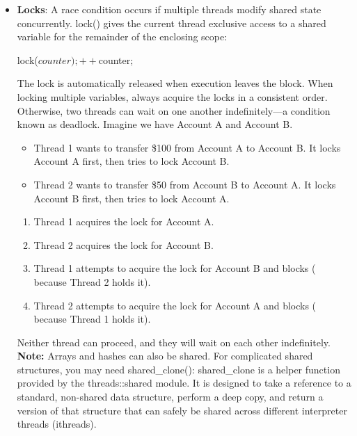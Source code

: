 \documentclass{report}
\begin{document}
\begin{itemize}
        \item \textbf{Locks}: A race condition occurs if multiple threads modify shared state concurrently. lock() gives the current thread exclusive access to a shared variable for the remainder of the enclosing scope:
            \bigbreak \noindent 
            \begin{perlcode}
                {
                    lock($counter);
                    ++$counter;
                }
            \end{perlcode}
            \bigbreak \noindent 
            The lock is automatically released when execution leaves the block. When locking multiple variables, always acquire the locks in a consistent order. Otherwise, two threads can wait on one another indefinitely—a condition known as deadlock.
            \bigbreak \noindent 
            Imagine we have Account A and Account B.
            \begin{itemize}
                \item Thread 1 wants to transfer \$100 from Account A to Account B. It locks Account A first, then tries to lock Account B.
                \item Thread 2 wants to transfer \$50 from Account B to Account A. It locks Account B first, then tries to lock Account A.
            \end{itemize}
            \begin{enumerate}
                \item Thread 1 acquires the lock for Account A.
                \item Thread 2 acquires the lock for Account B.
                \item Thread 1 attempts to acquire the lock for Account B and blocks ( because Thread 2 holds it).
                \item Thread 2 attempts to acquire the lock for Account A and blocks ( because Thread 1 holds it).
            \end{enumerate}
            Neither thread can proceed, and they will wait on each other indefinitely.
            \bigbreak \noindent 
            \textbf{Note:} Arrays and hashes can also be shared. For complicated shared structures, you may need shared\_clone():
            \bigbreak \noindent 
            shared\_clone is a helper function provided by the threads::shared module. It is designed to take a reference to a standard, non-shared data structure, perform a deep copy, and return a version of that structure that can safely be shared across different interpreter threads (ithreads).

\end{itemize}
\end{document}
